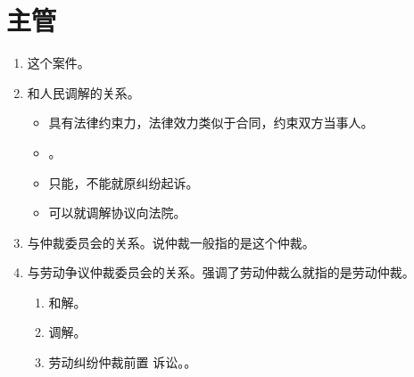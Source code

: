 \section{主管}
\begin{enumerate}
  \item 这个案件。
  \item 和人民调解的关系。
        \begin{itemize}
          \item 具有法律约束力，法律效力类似于合同，约束双方当事人。
          \item {}。
          \item 只能，不能就原纠纷起诉。
          \item 可以就调解协议向法院。
        \end{itemize}
  \item 与仲裁委员会的关系。说仲裁一般指的是这个仲裁。
  \item 与劳动争议仲裁委员会的关系。强调了劳动仲裁么就指的是劳动仲裁。
        \begin{enumerate}
          \item 和解。
          \item 调解。
          \item 劳动纠纷仲裁前置 \yjt 诉讼。。
        \end{enumerate}
\end{enumerate}

